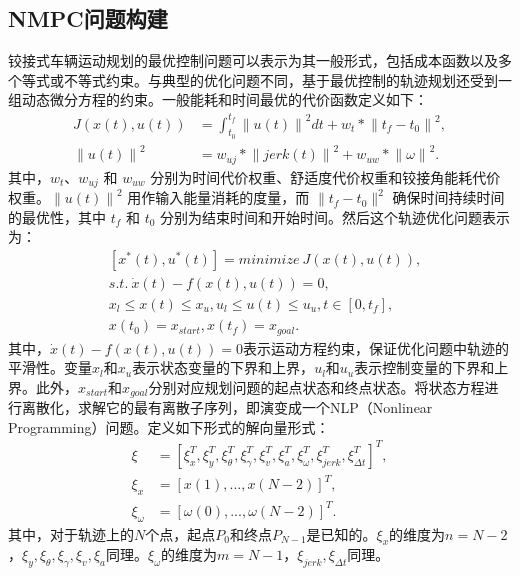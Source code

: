 \documentclass[master,academic]{ysuthesis} %
\begin{document}
		\subsection{NMPC问题构建}
		铰接式车辆运动规划的最优控制问题可以表示为其一般形式，包括成本函数以及多个等式或不等式约束。与典型的优化问题不同，基于最优控制的轨迹规划还受到一组动态微分方程的约束。一般能耗和时间最优的代价函数定义如下：
		\begin{equation}
			\begin{aligned}
				J(x(t),u(t)) &= \int_{t_0}^{t_f}
				\left\| u(t)\right\|^2dt +w_t*\left\|t_f-t_0\right\|^2,    \\
				\left\|u(t)\right\|^2&=w_{uj}*\left\|jerk(t)\right\|^2+w_{uw}*\left\|\omega\right\|^2.
			\end{aligned} 
		\end{equation}
		其中，$w_t$、$w_{uj}$ 和 $w_{uw}$ 分别为时间代价权重、舒适度代价权重和铰接角能耗代价权重。$\left\|u(t)\right\|^2$ 用作输入能量消耗的度量，而 $\|t_f- t_0\|^2$ 确保时间持续时间的最优性，其中 $t_f$ 和 $t_0$ 分别为结束时间和开始时间。然后这个轨迹优化问题表示为：
		\begin{equation}
			\begin{aligned}
				&\left[x^*(t),u^*(t)\right] = minimize\ J(x(t),u(t)),\\      
				&s.t.\ \dot x(t)-f(x(t),u(t))=0,\\
				&x_l \leq x(t) \leq x_u, u_l \leq u(t) \leq u_u,t\in \left[0,t_f\right],\\
				&x(t_0)=x_{start},x(t_f)=x_{goal}.\label{eq:最优控制优化问题}
			\end{aligned}   
		\end{equation}
		其中，$\dot x(t)-f(x(t),u(t))=0$表示运动方程约束，保证优化问题中轨迹的平滑性。变量$x_l$和$x_u$表示状态变量的下界和上界，$u_l$和$u_u$表示控制变量的下界和上界。此外，$x_{start}$和$x_{goal}$分别对应规划问题的起点状态和终点状态。将状态方程进行离散化，求解它的最有离散子序列，即演变成一个NLP（Nonlinear Programming）问题。定义如下形式的解向量形式：
		\begin{equation}
			\begin{aligned}
				\xi &=\left[ \xi _{x}^{T},\xi _{y}^{T},\xi _{\theta}^{T},\xi _{\gamma}^{T},\xi _{v}^{T},\xi _{a}^{T},\xi _{\omega}^{T},\xi_{{jerk}}^{T},\xi _{\Delta t}^{T} \right] ^T,\\
				\xi _x&=\left[ x\left( 1 \right) ,...,x\left( N-2 \right) \right] ^T,\\
				\xi _{\omega}&=\left[ \omega \left( 0 \right) ,...,\omega \left( N-2 \right) \right] ^T.
			\end{aligned}   
		\end{equation}
		其中，对于轨迹上的$N$个点，起点$P_0$和终点$P_{N-1}$是已知的。$\xi _{x}$的维度为$n=N-2$，$\xi _{y},\xi _{\theta},\xi _{\gamma},\xi _{v},\xi _{a}$同理。$\xi _{\omega}$的维度为$m=N-1$，$\xi_{jerk},\xi _{\Delta t}$同理。
\end{document}
